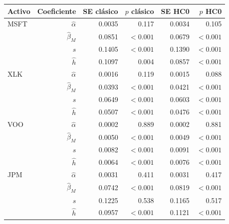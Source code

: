 \begin{tabular}{lrrrrr}
\hline
Activo & Coeficiente & SE clásico & $p$ clásico & SE HC0 & $p$ HC0 \\
\hline
MSFT & $\hat\alpha$ & 0.0035 & 0.117 & 0.0034 & 0.105 \\
 & $\hat\beta_M$ & 0.0851 & $<0.001$ & 0.0679 & $<0.001$ \\
 & $\hat s$ & 0.1405 & $<0.001$ & 0.1390 & $<0.001$ \\
 & $\hat h$ & 0.1097 & 0.004 & 0.0857 & $<0.001$ \\
XLK & $\hat\alpha$ & 0.0016 & 0.119 & 0.0015 & 0.088 \\
 & $\hat\beta_M$ & 0.0393 & $<0.001$ & 0.0421 & $<0.001$ \\
 & $\hat s$ & 0.0649 & $<0.001$ & 0.0603 & $<0.001$ \\
 & $\hat h$ & 0.0507 & $<0.001$ & 0.0476 & $<0.001$ \\
VOO & $\hat\alpha$ & 0.0002 & 0.889 & 0.0002 & 0.881 \\
 & $\hat\beta_M$ & 0.0050 & $<0.001$ & 0.0049 & $<0.001$ \\
 & $\hat s$ & 0.0082 & $<0.001$ & 0.0091 & $<0.001$ \\
 & $\hat h$ & 0.0064 & $<0.001$ & 0.0076 & $<0.001$ \\
JPM & $\hat\alpha$ & 0.0031 & 0.411 & 0.0031 & 0.417 \\
 & $\hat\beta_M$ & 0.0742 & $<0.001$ & 0.0819 & $<0.001$ \\
 & $\hat s$ & 0.1225 & 0.538 & 0.1165 & 0.517 \\
 & $\hat h$ & 0.0957 & $<0.001$ & 0.1121 & $<0.001$ \\
\hline
\end{tabular}
